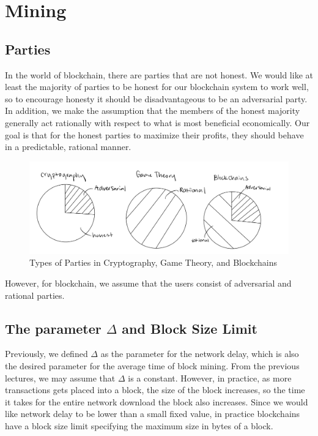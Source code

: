 \section{Mining}
\subsection{Parties}
In the world of blockchain, there are parties that are not honest. We would like at least the majority of parties to be honest for our blockchain system to work well, so to encourage honesty it should be disadvantageous to be an adversarial party. In addition, we make the assumption that the members of the honest majority generally act rationally with respect to what is most beneficial economically. Our goal is that for the honest parties to maximize their profits, they should behave in a predictable, rational manner.

\begin{figure}[ht]
    \centering
    \includegraphics[scale = 0.4]{figures/rational.png}
    \caption{Types of Parties in Cryptography, Game Theory, and Blockchains}
    \label{fig:rational}
\end{figure}

However, for blockchain, we assume that the users consist of adversarial and rational parties.

\subsection{The parameter $\Delta$ and Block Size Limit}
Previously, we defined $\Delta$ as the parameter for the network delay, which is also the desired parameter for the average time of block mining. From the previous lectures, we may assume that $\Delta$ is a constant. However, in practice, as more transactions gets placed into a block, the size of the block increases, so the time it takes for the entire network download the block also increases. Since we would like network delay to be lower than a small fixed value, in practice blockchains have a block size limit specifying the maximum size in bytes of a block.

